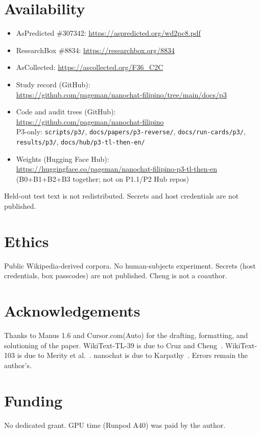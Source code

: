 \documentclass[11pt,a4paper]{article}
\begin{document}
\section*{Availability}
\begin{itemize}[leftmargin=1.6em,itemsep=0.35em]
\item AsPredicted \#307342: \url{https://aspredicted.org/wd2pc8.pdf}
\item ResearchBox \#8834: \url{https://researchbox.org/8834}
\item AsCollected: \url{https://ascollected.org/F36_C2C}
\item Study record (GitHub):\\
\url{https://github.com/pageman/nanochat-filipino/tree/main/docs/p3}
\item Code and audit trees (GitHub):\\
\url{https://github.com/pageman/nanochat-filipino}\\
P3-only: \texttt{scripts/p3/}, \texttt{docs/papers/p3-reverse/},
\texttt{docs/run-cards/p3/}, \texttt{results/p3/},
\texttt{docs/hub/p3-tl-then-en/}
\item Weights (Hugging Face Hub):\\
\url{https://huggingface.co/pageman/nanochat-filipino-p3-tl-then-en}\\
(B0+B1+B2+B3 together; not on P1.1/P2 Hub repos)
\end{itemize}
Held-out test text is not redistributed. Secrets and host credentials are not published.

\section*{Ethics}
Public Wikipedia-derived corpora. No human-subjects experiment. Secrets (host credentials, box passcodes) are not published. Cheng is not a coauthor.

\section*{Acknowledgements}
Thanks to Manus 1.6 and Cursor.com(Auto) for the drafting, formatting, and solutioning of the paper. WikiText-TL-39 is due to Cruz and Cheng~\cite{cruz2019eval}. WikiText-103 is due to Merity et al.~\cite{merity2017pointer}. nanochat is due to Karpathy~\cite{karpathy2026nanochat}. Errors remain the author's.

\section*{Funding}
No dedicated grant. GPU time (Runpod A40) was paid by the author.
\end{document}
